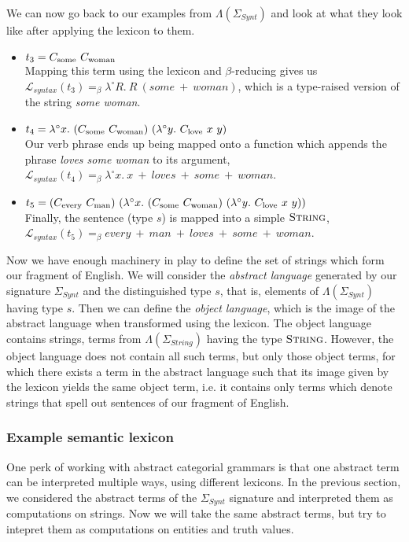 We can now go back to our examples from $\Lambda(\Sigma_{Synt})$ and
look at what they look like after applying the lexicon to them.
\begin{itemize}
\item $t_3 = \synt{some}\ \synt{woman}$ \\ Mapping this term using the
  lexicon and $\beta$-reducing gives us $\mathcal{L}_{syntax}(t_3)
  =_{\beta} \lambda^{\circ} R.\ R\ (some\ +\ woman)$, which is a
  type-raised version of the string \emph{some woman}.
\item $t_4 = \lambda^{\circ}
  x.\ (C_{\textrm{some}}\ C_{\textrm{woman}})\ (\lambda^{\circ}
  y.\ C_{\textrm{love}}\ x\ y)$ \\ Our verb phrase ends up being mapped onto
  a function which appends the phrase \emph{loves some woman} to its
  argument, $\mathcal{L}_{syntax}(t_4) =_{\beta} \lambda^{\circ}
  x.\ x\ +\ loves\ +\ some\ +\ woman$.
\item $t_5 = (\synt{every}\ \synt{man})\ (\lambda^{\circ}
  x.\ (\synt{some}\ \synt{woman})\ (\lambda^{\circ}
  y.\ \synt{love}\ x\ y))$ \\ Finally, the sentence (type $s$) is mapped
  into a simple $\textsc{String}$, $\mathcal{L}_{syntax}(t_5) =_{\beta}
  every\ +\ man\ +\ loves\ +\ some\ +\ woman$.
\end{itemize}

Now we have enough machinery in play to define the set of strings which
form our fragment of English. We will consider the \emph{abstract
  language} generated by our signature $\Sigma_{Synt}$ and the
distinguished type $s$, that is, elements of $\Lambda(\Sigma_{Synt})$
having type $s$. Then we can define the \emph{object language}, which is
the image of the abstract language when transformed using the
lexicon. The object language contains strings, terms from
$\Lambda(\Sigma_{String})$ having the type $\textsc{String}$. However,
the object language does not contain all such terms, but only those
object terms, for which there exists a term in the abstract language
such that its image given by the lexicon yields the same object term,
i.e. it contains only terms which denote strings that spell out
sentences of our fragment of English.

\subsubsection{Example semantic lexicon}

One perk of working with abstract categorial grammars is that one
abstract term can be interpreted multiple ways, using different
lexicons. In the previous section, we considered the abstract terms of
the $\Sigma_{Synt}$ signature and interpreted them as computations on
strings. Now we will take the same abstract terms, but try to intepret
them as computations on entities and truth values.

